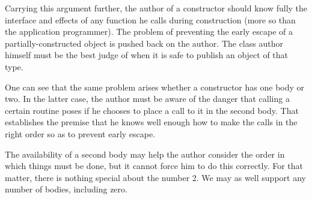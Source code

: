 Carrying this argument further, the author of a constructor should know fully the
interface and effects of any function he calls during construction (more so than the
application programmer).  The problem of preventing the early escape of a
partially-constructed object is pushed back on the author.  The class author himself must
be the best judge of when it is safe to publish an object of that type.  

One can see that the same problem arises whether a constructor has one body or two.  In
the latter case, the author must be aware of the danger that calling a certain routine
poses if he chooses to place a call to it in the second body.  That establishes the
premise that he knows well enough how to make the calls in the right order so as to
prevent early escape.  

The availability of a second body may help the author consider the order in which things
must be done, but it cannot force him to do this correctly.  For that matter, there is
nothing special about the number 2.  We may as well support any number of bodies,
including zero.
